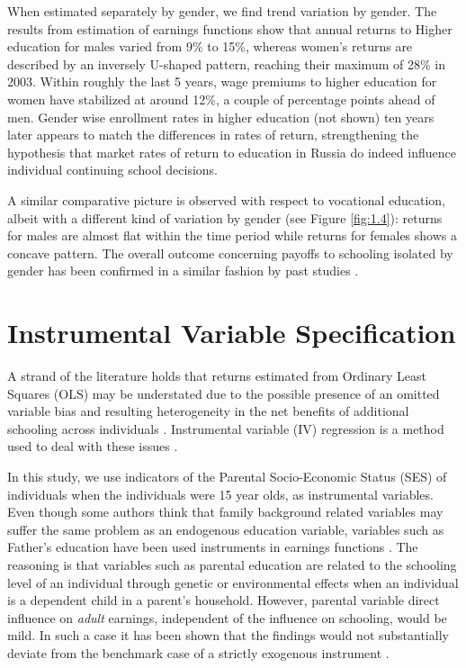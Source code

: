 \documentclass[alpha-refs]{wiley-article-01g}
\begin{document}
When estimated separately by gender, we find trend variation by gender. The results from estimation of earnings functions show that annual returns to Higher education for males varied from 9\% to 15\%, whereas women's returns are described by an inversely U-shaped pattern, reaching their maximum of 28\% in 2003. Within roughly the last 5 years, wage premiums to higher education for women have stabilized at around 12\%, a couple of percentage points ahead of men.  Gender wise enrollment rates in higher education (not shown) ten years later appears to match the differences in rates of return, strengthening the hypothesis that market rates of return to education in Russia do indeed influence individual continuing school decisions. 

A similar comparative picture is observed with respect to vocational education, albeit with a different kind of variation by gender (see Figure \ref{fig:1.4}): returns for males are almost flat within the time period while returns for females shows a concave pattern. The overall outcome concerning payoffs to schooling isolated by gender has been confirmed in a similar fashion by past studies \parencite[e.g.,][]{Cheidvasser2007}.

\section{Instrumental Variable Specification}

A strand of the literature holds that returns estimated from Ordinary Least 
Squares (OLS)  may be understated due to the possible presence of an 
omitted variable bias and resulting heterogeneity in the net benefits of 
additional schooling across individuals 
\parencite[e.g.,][]{Sakellariou2004, Akhmedjonov2011}. Instrumental 
variable (IV) regression is a method used to deal with these issues 
\parencite[e.g.,][]{Angrist1991, Card2001}.

In this study, we use indicators of the Parental Socio-Economic Status 
(SES) of individuals when the individuals were 15 year olds, as 
instrumental variables. Even though some authors think that family 
background related variables may suffer the same problem as an endogenous 
education variable, variables such as Father's education have been used 
instruments in earnings functions \parencite[e.g.,][]{Trostel2002, 
Sakellariou2004, Parker2006, Hoogerheide2012}. The reasoning is that 
variables such as parental education are related to the schooling level of 
an individual through genetic or environmental effects when an individual 
is a dependent child in a parent's household. However, parental variable 
direct influence on \textit{adult} earnings, independent of the influence 
on schooling, would be mild. In such a case it has been shown that the 
findings would not substantially deviate from the benchmark case of a
strictly exogenous instrument \parencite{Hoogerheide2012}.
\end{document}
